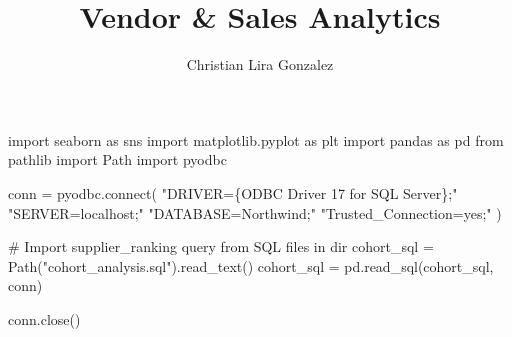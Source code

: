 \documentclass[
  letterpaper,
  DIV=11,
  numbers=noendperiod]{scrartcl}
\title{Vendor \& Sales Analytics}
\author{Christian Lira Gonzalez}
\date{}
\newenvironment{Shaded}{\begin{snugshade}}{\end{snugshade}}
\newcommand{\CommentTok}[1]{\textcolor[rgb]{0.37,0.37,0.37}{#1}}
\newcommand{\ExtensionTok}[1]{\textcolor[rgb]{0.00,0.23,0.31}{#1}}
\newcommand{\ImportTok}[1]{\textcolor[rgb]{0.00,0.46,0.62}{#1}}
\newcommand{\NormalTok}[1]{\textcolor[rgb]{0.00,0.23,0.31}{#1}}
\newcommand{\OperatorTok}[1]{\textcolor[rgb]{0.37,0.37,0.37}{#1}}
\newcommand{\StringTok}[1]{\textcolor[rgb]{0.13,0.47,0.30}{#1}}
\begin{document}
\maketitle


\begin{Shaded}
\begin{Highlighting}[]
\ImportTok{import}\NormalTok{ seaborn }\ImportTok{as}\NormalTok{ sns}
\ImportTok{import}\NormalTok{ matplotlib.pyplot }\ImportTok{as}\NormalTok{ plt}
\ImportTok{import}\NormalTok{ pandas }\ImportTok{as}\NormalTok{ pd}
\ImportTok{from}\NormalTok{ pathlib }\ImportTok{import}\NormalTok{ Path}
\ImportTok{import}\NormalTok{ pyodbc}
\end{Highlighting}
\end{Shaded}

\begin{Shaded}
\begin{Highlighting}[]
\NormalTok{conn }\OperatorTok{=}\NormalTok{ pyodbc.}\ExtensionTok{connect}\NormalTok{(}
    \StringTok{"DRIVER=\{ODBC Driver 17 for SQL Server\};"}
    \StringTok{"SERVER=localhost;"}
    \StringTok{"DATABASE=Northwind;"}
    \StringTok{"Trusted\_Connection=yes;"}
\NormalTok{)}

\CommentTok{\# Import supplier\_ranking query from SQL files in dir}
\NormalTok{cohort\_sql }\OperatorTok{=}\NormalTok{ Path(}\StringTok{"cohort\_analysis.sql"}\NormalTok{).read\_text()}
\NormalTok{cohort\_sql }\OperatorTok{=}\NormalTok{ pd.read\_sql(cohort\_sql, conn)}

\NormalTok{conn.close()}
\end{Highlighting}
\end{Shaded}
\end{document}
